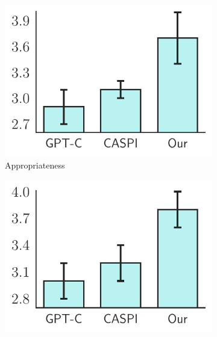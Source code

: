 \begin{figure}[tb]
    \centering
    \begin{minipage}{0.49\textwidth}
        \centering
     \begin{subfigure}[b]{0.48\textwidth}
         \centering
         \includegraphics[width=\textwidth]{./Tex/fig/appropriate_bar.pdf}
         \captionsetup{font=small}
         \vspace{-6mm}
         \caption{Appropriateness}
         \label{fig:appropriate}
     \end{subfigure}
     \hfill
     \begin{subfigure}[b]{0.48\textwidth}
         \centering
         \includegraphics[width=\textwidth]{./Tex/fig/fluency_bar.pdf}
         \captionsetup{font=small}

\end{subfigure}
\end{minipage}
\end{figure}
